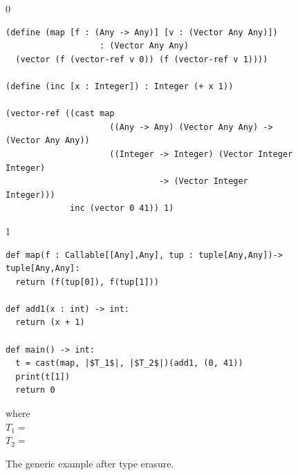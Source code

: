 \documentclass[7x10]{TimesAPriori_MIT}%
\def\racketEd{0}
\def\pythonEd{1}
\def\edition{0}
\numberwithin{theorem}{chapter}
\numberwithin{definition}{chapter}
\numberwithin{equation}{chapter}
\begin{document}
\begin{figure}[tbp]
\begin{tcolorbox}[colback=white]  
\if\edition\racketEd    
\begin{lstlisting}
(define (map [f : (Any -> Any)] [v : (Vector Any Any)])
                   : (Vector Any Any)
  (vector (f (vector-ref v 0)) (f (vector-ref v 1))))

(define (inc [x : Integer]) : Integer (+ x 1))

(vector-ref ((cast map
                     ((Any -> Any) (Vector Any Any) -> (Vector Any Any))  
                     ((Integer -> Integer) (Vector Integer Integer)
                               -> (Vector Integer Integer)))
             inc (vector 0 41)) 1)
\end{lstlisting}
\fi
\if\edition\pythonEd
\begin{lstlisting}
def map(f : Callable[[Any],Any], tup : tuple[Any,Any])-> tuple[Any,Any]:
  return (f(tup[0]), f(tup[1]))

def add1(x : int) -> int:
  return (x + 1)

def main() -> int:
  t = cast(map, |$T_1$|, |$T_2$|)(add1, (0, 41))
  print(t[1])
  return 0
\end{lstlisting}
{\small
where\\
$T_1 = $ \\
$T_2 = $ 
}
\fi
\end{tcolorbox}

\caption{The generic  example after type erasure.}
\label{fig:map-erase}
\end{figure}
\end{document}
